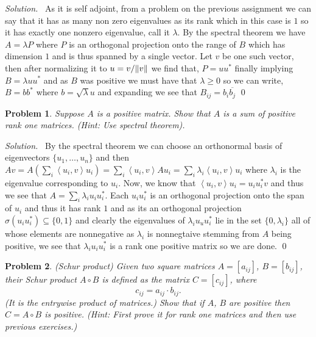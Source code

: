 \documentclass[12pt,a4paper]{article}
\newenvironment{solution}{%
  \par\noindent\textit{Solution.}\ }{\qed}
\theoremstyle{problemstyle}
\newtheorem{problem}{Problem}[section]
\newcommand{\ipp}[1]{{\left\langle{#1}\right\rangle}}
\begin{document}
\begin{solution}
   As it is self adjoint, from a problem on the previous assignment we can say that it has as many non zero eigenvalues as its rank which in this case is $1$ so it has exactly one nonzero eigenvalue, call it $\lambda$. 
   By the spectral theorem we have $A=\lambda P$ where $P$ is an orthogonal projection onto the range of $B$ which has dimension $1$ and is thus spanned by a single vector. 
   Let $v$ be one such vector, then after normalizing it to $u=v/\norm{v}$ we find that, $P=uu^*$ finally implying $B=\lambda uu^*$ and as $B$ was positive we must have that $\lambda\geq 0$ so we can write, $B=bb^*$ where $b=\sqrt{\lambda}u$ and expanding we see that $B_{ij}=b_i\overline{b_j}$
\end{solution}
\begin{problem}\label{prob:4-4}
Suppose $A$ is a positive matrix. Show that $A$ is a sum of positive rank one matrices. (Hint: Use spectral theorem).
\end{problem}
\begin{solution}
	By the spectral theorem we can choose an orthonormal basis of eigenvectors $\{u_1,\ldots,u_n\}$ and then $Av=A(\sum_i\ipp{u_i,v}u_i)=\sum_i\ipp{u_i,v}Au_i=\sum_i\lambda_i\ipp{u_i,v}u_i$ where $\lambda_i$ is the eigenvalue corresponding to $u_i$. 
	Now, we know that $\ipp{u_i,v}u_i=u_iu_i^*v$ and thus we see that $A=\sum_i\lambda_iu_iu_i^*$. 
	Each $u_iu_i^*$ is an orthogonal projection onto the span of $u_i$ and thus it has rank $1$ and as its an orthogonal projection $\sigma(u_iu_i^*)\subseteq\{0,1\}$ and clearly the eigenvalues of $\lambda_iu_uu_i^*$ lie in the set $\{0,\lambda_i\}$ all of whose elements are nonnegative as $\lambda_i$ is nonnegtaive stemming from $A$ being positive, we see that $\lambda_iu_iu_i^*$ is a rank one positive matrix so we are done.
\end{solution}
\begin{problem}\label{prob:4-5}
(Schur product) Given two square matrices $A = [a_{ij}]$, $B = [b_{ij}]$, their Schur product $A \circ B$ is defined as the matrix $C = [c_{ij}]$, where
\[
c_{ij} = a_{ij} \cdot b_{ij}.
\]
(It is the entrywise product of matrices.) Show that if $A$, $B$ are positive then $C = A \circ B$ is positive. (Hint: First prove it for rank one matrices and then use previous exercises.)
\end{problem}
\end{document}
